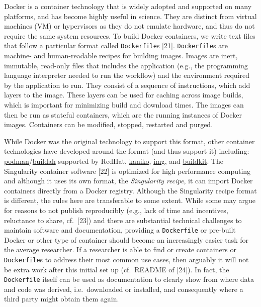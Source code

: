 \documentclass[10pt,letterpaper]{article}
\begin{document}
Docker is a container technology that is widely adopted and supported on
many platforms, and has become highly useful in science. They are
distinct from virtual machines (VM) or hypervisors as they do not
emulate hardware, and thus do not require the same system resources. To
build Docker containers, we write text files that follow a particular
format called \texttt{Dockerfile}s {[}21{]}. \texttt{Dockerfile}s are
machine- and human-readable recipes for building images. Images are
inert, immutable, read-only files that includes the application (e.g.,
the programming language interpreter needed to run the workflow) and the
environment required by the application to run. They consist of a
sequence of instructions, which add layers to the image. These layers
can be used for caching across image builds, which is important for
minimizing build and download times. The images can then be run as
stateful containers, which are the running instances of Docker images.
Containers can be modified, stopped, restarted and purged.

While Docker was the original technology to support this format, other
container technologies have developed around the format (and thus
support it) including:
\href{https://podman.io/}{podman}/\href{https://github.com/containers/buildah}{buildah}
supported by RedHat,
\href{https://github.com/GoogleContainerTools/kaniko}{kaniko},
\href{https://github.com/genuinetools/img}{img}, and
\href{https://github.com/moby/buildkit}{buildkit}. The Singularity
container software {[}22{]} is optimized for high performance computing
and although it uses its own format, the \emph{Singularity recipe}, it
can import Docker containers directly from a Docker registry. Although
the Singularity recipe format is different, the rules here are
transferable to some extent. While some may argue for reasons to not
publish reproducibly (e.g., lack of time and incentives, reluctance to
share, cf.~{[}23{]}) and there are substantial technical challenges to
maintain software and documentation, providing a \texttt{Dockerfile} or
pre-built Docker or other type of container should become an
increasingly easier task for the average researcher. If a researcher is
able to find or create containers or \texttt{Dockerfile}s to address
their most common use cases, then arguably it will not be extra work
after this initial set up (cf.~README of {[}24{]}). In fact, the
\texttt{Dockerfile} itself can be used as documentation to clearly show
from where data and code was derived, i.e.~downloaded or installed, and
consequently where a third party might obtain them again.
\end{document}
